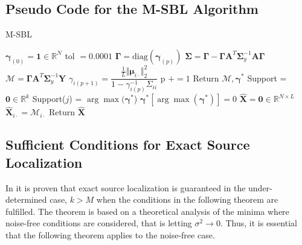 

\subsection{Pseudo Code for the M-SBL Algorithm}
\begin{algorithm}[H]
\caption{M-SBL}
\begin{algorithmic}[1]
\State $\boldsymbol{\gamma}_{(0)} = \mathbf{1} \in \mathbb{R}^N$
\State tol $=0.0001$
	\State $\boldsymbol{\Gamma} = \text{diag}(\boldsymbol{\gamma}_{(p)})$
	\State $\boldsymbol{\Sigma} = \boldsymbol{\Gamma} - \boldsymbol{\Gamma} \mathbf{A}^T \boldsymbol{\Sigma}_y^{-1} \mathbf{A} \boldsymbol{\Gamma}$
	\State $\mathcal{M} = \boldsymbol{\Gamma} \mathbf{A}^T \boldsymbol{\Sigma}_y^{-1} \mathbf{Y}$
		\State $\gamma_{i(p+1)} = \dfrac{\frac{1}{L} \Vert \boldsymbol{\mu}_{i \cdot} \Vert_2^2}{1 - \gamma_{i(p)}^{-1} \Sigma_{ii}}$
	\EndFor
	\State p $+= 1$
\EndWhile
\State Return $\mathcal{M}, \boldsymbol{\gamma}^{\ast}$
\EndProcedure
{}
\State Support = $\mathbf{0} \in \mathbb{R}^{k}$
		\State Support($j$) = $\arg \max (\boldsymbol{\gamma}^{\ast}$)
		\State $\boldsymbol{\gamma}^{\ast}\left[ \arg \max (\boldsymbol{\gamma}^{\ast})\right] = 0$
	\EndIf
\EndFor
\State $\hat{\mathbf{X}} = \mathbf{0} \in \mathbb{R}^{N \times L}$
	\State $\hat{\mathbf{X}}_{i\cdot} = \mathcal{M}_{i\cdot}$
\EndFor
\State Return $\hat{\mathbf{X}}$
\EndProcedure
\end{algorithmic}
\end{algorithm}

\subsection{Sufficient Conditions for Exact Source Localization}
In \cite{Balkan2014} it is proven that exact source localization is guaranteed in the under-determined case, $k > M$ when the conditions in the following theorem are fulfilled.
The theorem is based on a theoretical analysis of the minima where noise-free conditions are considered, that is letting $\sigma^2 \rightarrow 0$. 
Thus, it is essential that the following theorem applies to the noise-free case. 

